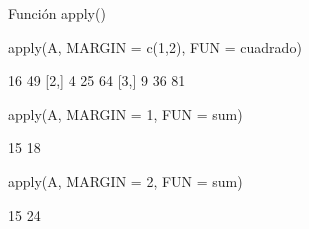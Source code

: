 \documentclass[
  ignorenonframetext,
  aspectratio=169]{beamer}
\newenvironment{Shaded}{\begin{snugshade}}{\end{snugshade}}
\newcommand{\AttributeTok}[1]{\textcolor[rgb]{0.77,0.63,0.00}{#1}}
\newcommand{\DecValTok}[1]{\textcolor[rgb]{0.00,0.00,0.81}{#1}}
\newcommand{\FunctionTok}[1]{\textcolor[rgb]{0.00,0.00,0.00}{#1}}
\newcommand{\NormalTok}[1]{#1}
\let\oldverbatim\verbatim
\let\endoldverbatim\endverbatim
\renewenvironment{verbatim}{\tiny\oldverbatim}{\endoldverbatim}
\begin{document}
\begin{frame}[fragile]{Función apply()}
\protect\hypertarget{funciuxf3n-apply-1}{}
\begin{Shaded}
\begin{Highlighting}[]
\FunctionTok{apply}\NormalTok{(A, }\AttributeTok{MARGIN =} \FunctionTok{c}\NormalTok{(}\DecValTok{1}\NormalTok{,}\DecValTok{2}\NormalTok{), }\AttributeTok{FUN =}\NormalTok{ cuadrado)}
\end{Highlighting}
\end{Shaded}

\begin{verbatim}
     [,1] [,2] [,3]
[1,]    1   16   49
[2,]    4   25   64
[3,]    9   36   81
\end{verbatim}

\begin{Shaded}
\begin{Highlighting}[]
\FunctionTok{apply}\NormalTok{(A, }\AttributeTok{MARGIN =} \DecValTok{1}\NormalTok{, }\AttributeTok{FUN =}\NormalTok{ sum)}
\end{Highlighting}
\end{Shaded}

\begin{verbatim}
[1] 12 15 18
\end{verbatim}

\begin{Shaded}
\begin{Highlighting}[]
\FunctionTok{apply}\NormalTok{(A, }\AttributeTok{MARGIN =} \DecValTok{2}\NormalTok{, }\AttributeTok{FUN =}\NormalTok{ sum)}
\end{Highlighting}
\end{Shaded}

\begin{verbatim}
[1]  6 15 24
\end{verbatim}
\end{frame}
\end{document}
